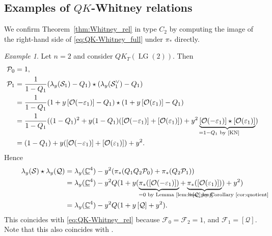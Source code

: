 \documentclass[a4paper, 11pt, reqno]{amsart}
\numberwithin{equation}{section}
\newcommand{\BC}{\mathbb{C}}
\newcommand{\udBC}{\underline{\BC}}
\newcommand{\CF}{\mathcal{F}}
\newcommand{\CO}{\mathcal{O}}
\newcommand{\CP}{\mathcal{P}}
\newcommand{\CQ}{\mathcal{Q}}
\newcommand{\CS}{\mathcal{S}}
\newcommand{\ve}{\varepsilon}
\newcommand{\LG}{\operatorname{LG}}
\newcommand{\class}[1]{\left[ #1 \right]}
\theoremstyle{plain}
\theoremstyle{definition}
\theoremstyle{remark}
\newtheorem{exm}[thm]{Example}
\begin{document}
\subsection{\texorpdfstring{Examples of $QK$-Whitney relations}{Examples of QK-Whitney relations}}
We confirm Theorem~\ref{thm:Whitney_rel} in type $C_{2}$ by computing the image of the right-hand side of \eqref{eq:QK-Whitney_full} under $\pi_{\ast}$ directly. 
\begin{exm}
Let $n = 2$ and consider $QK_{T}(\LG(2))$. 
Then 
\begin{align}
\CP_{0} &= 1, \\ 
\CP_{1} &= \frac{1}{1-Q_{1}} (\lambda_{y}(\CS_{1}) - Q_{1}) \star (\lambda_{y}(\CS_{1}^{\vee}) - Q_{1}) \\ 
&= \frac{1}{1-Q_{1}} (1 + y\class{\CO(-\ve_{1})} - Q_{1}) \star (1 + y\class{\CO(\ve_{1})} - Q_{1}) \\ 
&= \frac{1}{1-Q_{1}} ((1-Q_{1})^{2} + y(1-Q_{1})(\class{\CO(-\ve_{1})} + \class{\CO(\ve_{1})}) + y^{2} \underbrace{\class{\CO(-\ve_{1})} \star \class{\CO(\ve_{1})}}_{\mathrlap{\hspace{-14mm}= 1-Q_{1} \text{ by \cite[Lemma~6.7]{KN}}}}) \\
&= (1-Q_{1}) + y(\class{\CO(-\ve_{1})} + \class{\CO(\ve_{1})}) + y^{2}. 
\end{align}
Hence 
\begin{align}
\lambda_{y}(\CS) \star \lambda_{y}(\CQ) &= \lambda_{y}(\udBC^{4}) - y^{2} (\pi_{\ast}(Q_{1}Q_{2}\CP_{0}) + \pi_{\ast} (Q_{2}\CP_{1})) \\ 
&= \lambda_{y}(\udBC^{4}) - y^{2} Q (1 + y (\underbrace{\pi_{\ast}(\class{\CO(-\ve_{1})})}_{\mathrlap{\hspace{-10mm}=0 \text{ by Lemma~\ref{lem:line_proj}}}} + \underbrace{\pi_{\ast}(\class{\CO(\ve_{1})})}_{\mathrlap{\hspace{-8mm}= \class{\CQ} \text{ by Corollary~\ref{cor:quotient}}}}) + y^{2}) \\ 
&= \lambda_{y}(\udBC^{4}) - y^{2}Q (1 + y \class{\CQ} + y^{2}). 
\end{align}
This coincides with \eqref{eq:QK-Whitney_rel} because $\CF_{0} = \CF_{2} = 1$, and $\CF_{1} = \class{\CQ}$.  
Note that this also coincides with \cite[(7.24)]{GMSZ}. 
\end{exm}
\end{document}
